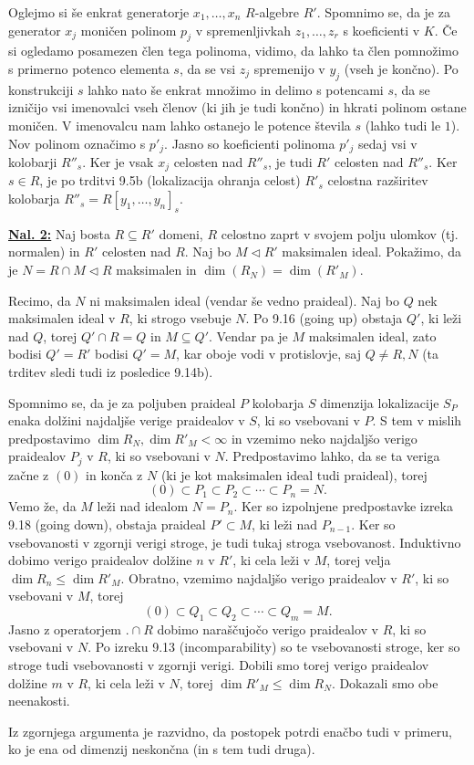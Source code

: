 \documentclass[a4paper, 12pt]{article}
\newcommand{\subideal}{\vartriangleleft}
\begin{document}
Oglejmo si še enkrat generatorje $x_1,\dots,x_n$ $R$-algebre $R'$. Spomnimo se, da je za generator $x_j$ moničen polinom $p_j$ v spremenljivkah $z_1,\dots,z_r$ s koeficienti v $K$. Če si ogledamo posamezen člen tega polinoma, vidimo, da lahko ta člen pomnožimo s primerno potenco elementa $s$, da se vsi $z_j$ spremenijo v $y_j$ (vseh je končno). Po konstrukciji $s$ lahko nato še enkrat množimo in delimo s potencami $s$, da se izničijo vsi imenovalci vseh členov (ki jih je tudi končno) in hkrati polinom ostane moničen. V imenovalcu nam lahko ostanejo le potence števila $s$ (lahko tudi le $1$). Nov polinom označimo s $p'_j$. Jasno so koeficienti polinoma $p'_j$ sedaj vsi v kolobarji $R''_s$. Ker je vsak $x_j$ celosten nad $R''_s$, je tudi $R'$ celosten nad $R''_s$. Ker $s \in R$, je po trditvi 9.5b (lokalizacija ohranja celost) $R'_s$ celostna razširitev kolobarja $R''_s = R[y_1,\dots,y_n]_s$.
\newline

\underline{\textbf{Nal. 2:}}
Naj bosta $R \subseteq R'$ domeni, $R$ celostno zaprt v svojem polju ulomkov (tj. normalen) in $R'$ celosten nad $R$. Naj bo $M \subideal R'$ maksimalen ideal. Pokažimo, da je $N = R \cap M \subideal R$ maksimalen in $\dim(R_N) = \dim(R'_M)$.

Recimo, da $N$ ni maksimalen ideal (vendar še vedno praideal). Naj bo $Q$ nek maksimalen ideal v $R$, ki strogo vsebuje $N$. Po 9.16 (going up) obstaja $Q'$, ki leži nad $Q$, torej $Q' \cap R = Q$ in $M \subseteq Q'$. Vendar pa je $M$ maksimalen ideal, zato bodisi $Q' = R'$ bodisi $Q' = M$, kar oboje vodi v protislovje, saj $Q \neq R, N$ (ta trditev sledi tudi iz posledice 9.14b).

Spomnimo se, da je za poljuben praideal $P$ kolobarja $S$ dimenzija lokalizacije $S_P$ enaka dolžini najdaljše verige praidealov v $S$, ki so vsebovani v $P$. S tem v mislih predpostavimo $\dim R_N, \dim R'_M < \infty$ in vzemimo neko najdaljšo verigo praidealov $P_j$ v $R$, ki so vsebovani v $N$. Predpostavimo lahko, da se ta veriga začne z $(0)$ in konča z $N$ (ki je kot maksimalen ideal tudi praideal), torej
\[
(0) \subset P_1 \subset P_2 \subset \cdots \subset P_n = N.
\]
Vemo že, da $M$ leži nad idealom $N = P_n$. Ker so izpolnjene predpostavke izreka 9.18 (going down), obstaja praideal $P' \subset M$, ki leži nad $P_{n-1}$. Ker so vsebovanosti v zgornji verigi stroge, je tudi tukaj stroga vsebovanost. Induktivno dobimo verigo praidealov dolžine $n$ v $R'$, ki cela leži v $M$, torej velja $\dim R_n \leq \dim R'_M$.
Obratno, vzemimo najdaljšo verigo praidealov v $R'$, ki so vsebovani v $M$, torej
\[
(0) \subset Q_1 \subset Q_2 \subset \cdots \subset Q_m = M.
\]
Jasno z operatorjem $. \cap R$ dobimo naraščujočo verigo praidealov v $R$, ki so vsebovani v $N$. Po izreku 9.13 (incomparability) so te vsebovanosti stroge, ker so stroge tudi vsebovanosti v zgornji verigi. Dobili smo torej verigo praidealov dolžine $m$ v $R$, ki cela leži v $N$, torej $\dim R'_M \leq \dim R_N$. Dokazali smo obe neenakosti.

Iz zgornjega argumenta je razvidno, da postopek potrdi enačbo tudi v primeru, ko je ena od dimenzij neskončna (in s tem tudi druga).
\end{document}
